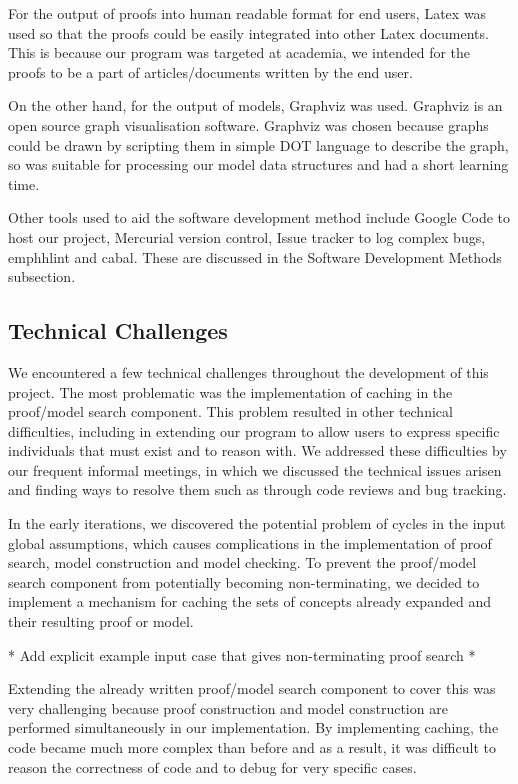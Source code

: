 For the output of proofs into human readable format for end users, Latex was used so that the proofs could be easily integrated into other Latex documents. This is because our program was targeted at academia, we intended for the proofs to be a part of articles/documents written by the end user.

On the other hand, for the output of models, Graphviz was used. Graphviz is an open source graph visualisation software. Graphviz was chosen because graphs could be drawn by scripting them in simple DOT language to describe the graph, so was suitable for processing our model data structures and had a short learning time.

Other tools used to aid the software development method include Google Code to host our project, Mercurial version control, Issue tracker to log complex bugs, emph{hlint} and cabal. These are discussed in the Software Development Methods subsection.

\subsection{Technical Challenges}

We encountered a few technical challenges throughout the development of this project. The most problematic was the implementation of caching in the proof/model search component. This problem resulted in other technical difficulties, including in extending our program to allow users to express specific individuals that must exist and to reason with. We addressed these difficulties by our frequent informal meetings, in which we discussed the technical issues arisen and finding ways to resolve them such as through code reviews and bug tracking.

In the early iterations, we discovered the potential problem of cycles in the input global assumptions, which causes complications in the implementation of proof search, model construction and model checking. To prevent the proof/model search component from potentially becoming non-terminating, we decided to implement a mechanism for caching the sets of concepts already expanded and their resulting proof or model.

* Add explicit example input case that gives non-terminating proof search *

Extending the already written proof/model search component to cover this was very challenging because proof construction and model construction are performed simultaneously in our implementation. By implementing caching, the code became much more complex than before and as a result, it was difficult to reason the correctness of code and to debug for very specific cases.

